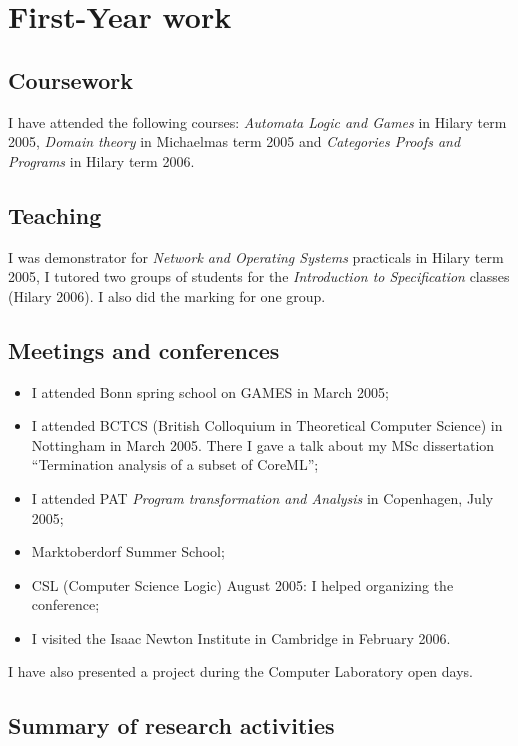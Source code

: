 \chapter{First-Year work}

\section{Coursework}
I have attended the following courses: \emph{Automata Logic and
Games} in Hilary term 2005, \emph{Domain theory} in Michaelmas term
2005 and \emph{Categories Proofs and Programs} in Hilary term 2006.

\section{Teaching}

I was demonstrator for \emph{Network and Operating Systems}
practicals in Hilary term 2005, I tutored two groups of students for
the \emph{Introduction to Specification} classes (Hilary 2006). I
also did the marking for one group.

\section{Meetings and conferences}
\begin{itemize}
\item I attended Bonn spring school on GAMES in March 2005;

\item  I attended BCTCS (British Colloquium in
Theoretical Computer Science) in Nottingham in March 2005. There I
gave a talk about my MSc dissertation ``Termination analysis of a
subset of CoreML'';

\item I attended PAT \emph{Program transformation and Analysis} in Copenhagen, July 2005;

\item Marktoberdorf Summer School;
\item CSL (Computer Science Logic) August 2005:
I helped organizing the conference;
\item I visited the Isaac Newton Institute in Cambridge in February
2006.
\end{itemize}
I have also presented a project during the Computer Laboratory open
days.


\section{Summary of research activities}

